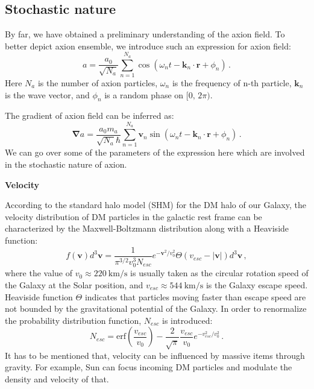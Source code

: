 \subsection{Stochastic nature}\label{sec:Axion_wind:Stochastic_nature}

By far, we have obtained a preliminary understanding of the axion field. 
To better depict axion ensemble, we introduce such an expression for axion field:
\begin{equation}
    a = \dfrac{a_0}{\sqrt{N_a}}\sum_{n=1}^{N_a}  \cos(\omega_n t - \mathbf{k}_n \cdot \mathbf{r} + \phi_n)\,.\label{eq:axion_ensemble}
\end{equation}
Here $N_a$ is the number of axion particles, $\omega_n$ is the frequency of n-th particle, $\mathbf{k}_n$ is the wave vector, and $\phi_n$ is a random phase on $[0,\, 2\pi)$. 

The gradient of axion field can be inferred as:
\begin{equation}
    {\boldsymbol \nabla}a =  \dfrac{a_0 m_a }{\sqrt{N_a} \hbar}\sum_{n=1}^{N_a} \mathbf{v}_n \sin(\omega_n t - \mathbf{k}_n\cdot \mathbf{r} + \phi_n)\,. \label{eq:axion_ensemble_gradient}
\end{equation}
We can go over some of the parameters of the expression here which are involved in the stochastic nature of axion. 
    
\textbf{Velocity}

According to the standard halo model (SHM) for the DM halo of our Galaxy\cite{Schumann_2019, Evans_PhysRevD.99.023012}, the velocity distribution of DM particles in the galactic rest frame can be characterized by the Maxwell-Boltzmann distribution along with a Heaviside function:
\begin{equation}
    f(\mathbf{v})d^3\mathbf{v} = \dfrac{1}{\pi^{3/2} v_0^3 N_{esc}} e^{- \mathbf{v}^2 / v_0^2} \Theta(v_{esc} - |\mathbf{v}|)d^3\mathbf{v}\,,
\end{equation}
where the value of $v_0 \approx \SI{220}{\km / \second}$ is usually taken as the circular rotation speed of the Galaxy at the Solar position, and $v_{esc} \approx \SI{544}{\km / \second}$ is the Galaxy escape speed. Heaviside function $\Theta$ indicates that particles moving faster than escape speed are not bounded by the gravitational potential of the Galaxy. In order to renormalize the probability distribution function, $N_{esc}$ is introduced:
\begin{equation}
    N_{esc} = \mathrm{erf}\left(\dfrac{v_{esc}}{v_0}\right) - \dfrac{2}{\sqrt{\pi}} \dfrac{v_{esc}}{v_0}e^{- v_{esc}^2 / v_0^2}\,.
\end{equation}
It has to be mentioned that, velocity can be influenced by massive items through gravity. For example, Sun can focus incoming DM particles and modulate the density and velocity of that. 
    
